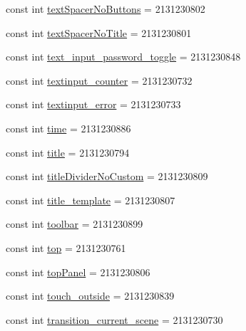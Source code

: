 \begin{DoxyCompactItemize}
\item 
const int \mbox{\hyperlink{class_f_w_p_s___app_1_1_droid_1_1_resource_1_1_id_a0e701da6eb848d0c0c4a0dbfac1d4158}{text\+Spacer\+No\+Buttons}} = 2131230802
\item 
const int \mbox{\hyperlink{class_f_w_p_s___app_1_1_droid_1_1_resource_1_1_id_ae0ac71d59f9e4a94dd0b548575a6e53d}{text\+Spacer\+No\+Title}} = 2131230801
\item 
const int \mbox{\hyperlink{class_f_w_p_s___app_1_1_droid_1_1_resource_1_1_id_a65150dbaff65e9127988c11eef66999b}{text\+\_\+input\+\_\+password\+\_\+toggle}} = 2131230848
\item 
const int \mbox{\hyperlink{class_f_w_p_s___app_1_1_droid_1_1_resource_1_1_id_a83d9eeec61e1112b5826602947a05ed0}{textinput\+\_\+counter}} = 2131230732
\item 
const int \mbox{\hyperlink{class_f_w_p_s___app_1_1_droid_1_1_resource_1_1_id_ab4a54f8ea800768fc9331ac16f4d708e}{textinput\+\_\+error}} = 2131230733
\item 
const int \mbox{\hyperlink{class_f_w_p_s___app_1_1_droid_1_1_resource_1_1_id_ae7542e297d4549e299ea7a4149a85ee3}{time}} = 2131230886
\item 
const int \mbox{\hyperlink{class_f_w_p_s___app_1_1_droid_1_1_resource_1_1_id_a6175f7fa0e94bd234a07e55b45ddb6c0}{title}} = 2131230794
\item 
const int \mbox{\hyperlink{class_f_w_p_s___app_1_1_droid_1_1_resource_1_1_id_abb3e9f5742f58de9286b1c6745f66455}{title\+Divider\+No\+Custom}} = 2131230809
\item 
const int \mbox{\hyperlink{class_f_w_p_s___app_1_1_droid_1_1_resource_1_1_id_af71781335c1668e31e24c6543e7b406b}{title\+\_\+template}} = 2131230807
\item 
const int \mbox{\hyperlink{class_f_w_p_s___app_1_1_droid_1_1_resource_1_1_id_ae38774aa7c66f02e4472897b642244d8}{toolbar}} = 2131230899
\item 
const int \mbox{\hyperlink{class_f_w_p_s___app_1_1_droid_1_1_resource_1_1_id_ab984fd1d62811a9470819eee0e9b40b0}{top}} = 2131230761
\item 
const int \mbox{\hyperlink{class_f_w_p_s___app_1_1_droid_1_1_resource_1_1_id_a5cd6311217bb035aadba46110f913ce6}{top\+Panel}} = 2131230806
\item 
const int \mbox{\hyperlink{class_f_w_p_s___app_1_1_droid_1_1_resource_1_1_id_a17e1e0e74a0020fdd31578dae8bd40f1}{touch\+\_\+outside}} = 2131230839
\item 
const int \mbox{\hyperlink{class_f_w_p_s___app_1_1_droid_1_1_resource_1_1_id_a9caa4277c3d72fc46e1bd012fc3b6c6e}{transition\+\_\+current\+\_\+scene}} = 2131230730

\end{DoxyCompactItemize}
